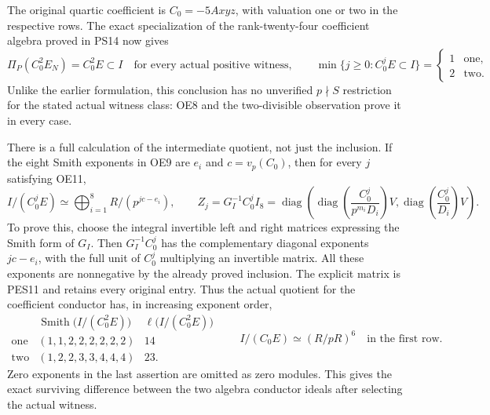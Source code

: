 The original quartic coefficient is $C_0=-5Axyz$, with valuation
one or two in the respective rows. The exact specialization of
the rank-twenty-four coefficient algebra proved in PS14 now gives
\begin{equation}
 \Pi_P(C_0^2E_N)=C_0^2E\subset I
 \quad\text{for every actual positive witness},\qquad
 \min\{j\ge0:C_0^jE\subset I\}
  =\begin{cases}1&\text{one},\\2&\text{two}.
                      \end{cases}                      \tag{OE11}
\end{equation}
Unlike the earlier formulation, this conclusion has no unverified
$p\nmid S$ restriction for the stated actual witness class: OE8
and the two-divisible observation prove it in every case.

There is a full calculation of the intermediate quotient, not just
the inclusion. If the eight Smith exponents in OE9 are $e_i$ and
$c=v_p(C_0)$, then for every $j$ satisfying OE11,
\begin{equation}
 I/(C_0^jE)\simeq\bigoplus_{i=1}^8R/(p^{jc-e_i}),
 \qquad
 Z_j=G_I^{-1}C_0^jI_8
  =\operatorname{diag}\left(
   \operatorname{diag}\left(\frac{C_0^j}{p^{m_i}D_i}\right)V,
   \operatorname{diag}\left(\frac{C_0^j}{D_i}\right)V\right).
                                                               \tag{OE12}
\end{equation}
To prove this, choose the integral invertible left and right
matrices expressing the Smith form of $G_I$. Then $G_I^{-1}C_0^j$
has the complementary diagonal exponents $jc-e_i$, with the full
unit of $C_0^j$ multiplying an invertible matrix. All these
exponents are nonnegative by the already proved inclusion. The
explicit matrix is PES11 and retains every original entry. Thus
the actual quotient for the coefficient conductor has, in
increasing exponent order,
\begin{equation}
 \begin{array}{c|c|c}
 & \operatorname{Smith}\bigl(I/(C_0^2E)\bigr)&
                 \ell\bigl(I/(C_0^2E)\bigr)\\\hline
 \text{one}&(1,1,2,2,2,2,2,2)&14\\
 \text{two}&(1,2,2,3,3,4,4,4)&23.
 \end{array}
 \qquad I/(C_0E)\simeq(R/pR)^6\quad\text{in the first row}.
                                                               \tag{OE13}
\end{equation}
Zero exponents in the last assertion are omitted as zero modules.
This gives the exact surviving difference between the two algebra
conductor ideals after selecting the actual witness.

